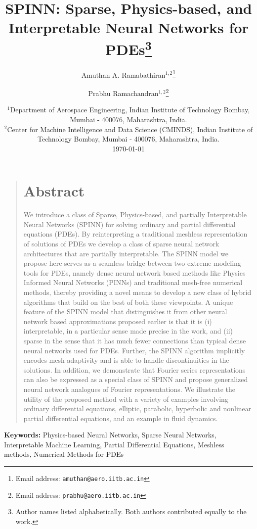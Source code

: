 \documentclass[12pt]{article}
\title{SPINN: Sparse, Physics-based, and \rR{partially} Interpretable Neural Networks for PDEs\footnote{Author names listed alphabetically. Both authors contributed equally to the work.}}
\author{\textsf{Amuthan A. Ramabathiran}$^{1,2}$\footnote{Email address: \texttt{amuthan@aero.iitb.ac.in}} \and \textsf{Prabhu Ramachandran}$^{1,2}$\footnote{Email address: \texttt{prabhu@aero.iitb.ac.in}}}
\date{%
	$^1${\small Department of Aerospace Engineering, Indian Institute of Technology Bombay, Mumbai - 400076, Maharashtra, India.}\\[2ex]%
	$^2${\small Center for Machine Intelligence and Data Science (CMINDS), Indian Institute of Technology Bombay, Mumbai - 400076, Maharashtra, India.}\\[2ex]%
	\today
}
\newcommand{\new}[1]{#1}
\newcommand{\rR}[1]{#1}
\providecommand{\keywords}[1]{\textbf{\textsf{Keywords:}} #1}
\begin{document}
\maketitle

\begin{quote}
\section*{Abstract}
We introduce a class of Sparse, Physics-based, and \rR{partially} Interpretable Neural Networks (SPINN) for solving ordinary and partial differential equations \new{(PDEs)}. By reinterpreting a traditional meshless representation of solutions of PDEs we develop a class of sparse neural network architectures that are \rR{partially} interpretable. The SPINN model we propose here serves as a seamless bridge between two extreme modeling tools for PDEs, \new{namely} dense neural network based methods \new{like Physics Informed Neural Networks (PINNs)} and traditional mesh-free numerical methods, thereby providing a novel means to develop a new class of hybrid algorithms that build on the best of both these viewpoints. A unique feature of the SPINN model that distinguishes it from other neural network based approximations proposed earlier is that it is (i) interpretable\rR{, in a particular sense made precise in the work}, and (ii) sparse in the sense that it has much \new{fewer connections than typical dense neural networks used for PDEs.} Further, the SPINN algorithm implicitly encodes mesh adaptivity and is able to handle discontinuities in the solutions. In addition, we demonstrate that Fourier series representations can \new{also} be expressed as a special class of SPINN and propose generalized neural network analogues of Fourier representations. We illustrate the utility of the proposed method with a variety of examples involving ordinary differential equations, elliptic, parabolic, hyperbolic and nonlinear partial differential equations, and an example in fluid dynamics.
\end{quote}


\keywords{Physics-based Neural Networks, Sparse Neural Networks, Interpretable Machine Learning, Partial Differential Equations, Meshless methods, Numerical Methods for PDEs}

\end{document}
